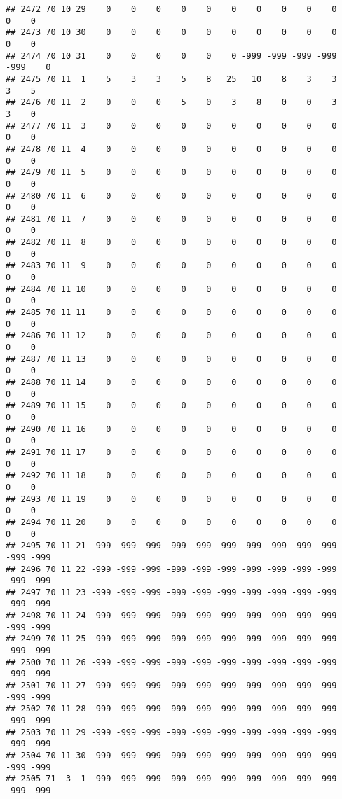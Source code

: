 \documentclass[]{article}
\begin{document}
\begin{verbatim}
## 2472 70 10 29    0    0    0    0    0    0    0    0    0    0    0    0
## 2473 70 10 30    0    0    0    0    0    0    0    0    0    0    0    0
## 2474 70 10 31    0    0    0    0    0    0 -999 -999 -999 -999 -999    0
## 2475 70 11  1    5    3    3    5    8   25   10    8    3    3    3    5
## 2476 70 11  2    0    0    0    5    0    3    8    0    0    3    3    0
## 2477 70 11  3    0    0    0    0    0    0    0    0    0    0    0    0
## 2478 70 11  4    0    0    0    0    0    0    0    0    0    0    0    0
## 2479 70 11  5    0    0    0    0    0    0    0    0    0    0    0    0
## 2480 70 11  6    0    0    0    0    0    0    0    0    0    0    0    0
## 2481 70 11  7    0    0    0    0    0    0    0    0    0    0    0    0
## 2482 70 11  8    0    0    0    0    0    0    0    0    0    0    0    0
## 2483 70 11  9    0    0    0    0    0    0    0    0    0    0    0    0
## 2484 70 11 10    0    0    0    0    0    0    0    0    0    0    0    0
## 2485 70 11 11    0    0    0    0    0    0    0    0    0    0    0    0
## 2486 70 11 12    0    0    0    0    0    0    0    0    0    0    0    0
## 2487 70 11 13    0    0    0    0    0    0    0    0    0    0    0    0
## 2488 70 11 14    0    0    0    0    0    0    0    0    0    0    0    0
## 2489 70 11 15    0    0    0    0    0    0    0    0    0    0    0    0
## 2490 70 11 16    0    0    0    0    0    0    0    0    0    0    0    0
## 2491 70 11 17    0    0    0    0    0    0    0    0    0    0    0    0
## 2492 70 11 18    0    0    0    0    0    0    0    0    0    0    0    0
## 2493 70 11 19    0    0    0    0    0    0    0    0    0    0    0    0
## 2494 70 11 20    0    0    0    0    0    0    0    0    0    0    0    0
## 2495 70 11 21 -999 -999 -999 -999 -999 -999 -999 -999 -999 -999 -999 -999
## 2496 70 11 22 -999 -999 -999 -999 -999 -999 -999 -999 -999 -999 -999 -999
## 2497 70 11 23 -999 -999 -999 -999 -999 -999 -999 -999 -999 -999 -999 -999
## 2498 70 11 24 -999 -999 -999 -999 -999 -999 -999 -999 -999 -999 -999 -999
## 2499 70 11 25 -999 -999 -999 -999 -999 -999 -999 -999 -999 -999 -999 -999
## 2500 70 11 26 -999 -999 -999 -999 -999 -999 -999 -999 -999 -999 -999 -999
## 2501 70 11 27 -999 -999 -999 -999 -999 -999 -999 -999 -999 -999 -999 -999
## 2502 70 11 28 -999 -999 -999 -999 -999 -999 -999 -999 -999 -999 -999 -999
## 2503 70 11 29 -999 -999 -999 -999 -999 -999 -999 -999 -999 -999 -999 -999
## 2504 70 11 30 -999 -999 -999 -999 -999 -999 -999 -999 -999 -999 -999 -999
## 2505 71  3  1 -999 -999 -999 -999 -999 -999 -999 -999 -999 -999 -999 -999

\end{verbatim}
\end{document}
